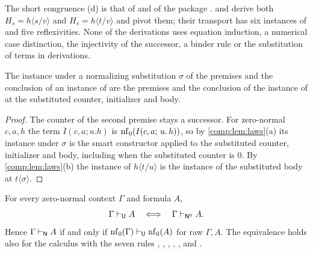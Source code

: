 \begin{remark}
The short congruence (d) is that of  and of the
package .  and
 derive both $H_s=h\langle s/v\rangle$ and
$H_s=h\langle t/v\rangle$ and pivot them; their transport has six instances
of  and five reflexivities. None of the derivations uses
equation induction, a numerical case distinction, the injectivity of the
successor, a binder rule or the substitution of terms in derivations.
\end{remark}

\begin{proposition}
\label{comp:prop:stepsubst}
The instance under a normalizing substitution $\sigma$ of the premises and
the conclusion of an instance of  are the premises and the
conclusion of the instance of  at the substituted counter,
initializer and body.
\end{proposition}

\begin{proof}
The counter of the second premise stays a successor. For zero-normal
$c,a,h$ the term $\overline{I}(c,a;u.h)$ is $\operatorname{nf}_0(I(c,a;\,u.\,h))$, so by
\cref{comp:lem:laws}(a) its instance under $\sigma$ is the smart
constructor applied to the substituted counter, initializer and body,
including when the substituted counter is $0$. By \cref{comp:lem:laws}(b)
the instance of $h\langle t/u\rangle$ is the instance of the substituted
body at $t\langle\sigma\rangle$.
\end{proof}

\begin{theorem}
\label{comp:thm:step}
For every zero-normal context $\Gamma$ and formula $A$,
\[
 \Gamma\vdash_{\mathsf U}A
 \quad\Longleftrightarrow\quad
 \Gamma\vdash_{\mathsf{N}^{0}}A .
\]
Hence $\Gamma\vdash_{\mathsf{N}}A$ if and only if
$\operatorname{nf}_0(\Gamma)\vdash_{\mathsf U}\operatorname{nf}_0(A)$ for raw $\Gamma,A$. The
equivalence holds also for the calculus with the seven rules ,
, , , ,
 and .
\end{theorem}

